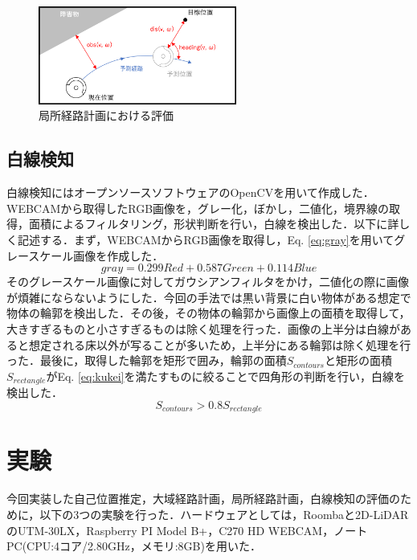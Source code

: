 \documentclass{jarticle}
\renewcommand{\%}{\textsf{\char`\%}}
\begin{document}
\begin{figure}
\begin{center}
	\includegraphics[width=6.5cm]{./picture/DWA.png}
\end{center}
\vspace{-3mm}
	\caption{局所経路計画における評価}
	\label{fig:DWA}
\end{figure}
\subsection{白線検知}
白線検知にはオープンソースソフトウェアのOpenCV\cite{opencv}を用いて作成した．WEBCAMから取得したRGB画像を，グレー化，ぼかし，二値化，境界線の取得，面積によるフィルタリング，形状判断を行い，白線を検出した．以下に詳しく記述する．まず，WEBCAMからRGB画像を取得し，Eq. \ref{eq:gray}を用いてグレースケール画像を作成した．
\vspace{-3mm}
\begin{equation}
	gray = 0.299Red + 0.587Green + 0.114Blue
	\label{eq:gray}
\end{equation}
そのグレースケール画像に対してガウシアンフィルタをかけ，二値化の際に画像が煩雑にならないようにした．今回の手法では黒い背景に白い物体がある想定で物体の輪郭を検出した．その後，その物体の輪郭から画像上の面積を取得して，大きすぎるものと小さすぎるものは除く処理を行った．画像の上半分は白線があると想定される床以外が写ることが多いため，上半分にある輪郭は除く処理を行った．最後に，取得した輪郭を矩形で囲み，輪郭の面積$S_{contours}$と矩形の面積$S_{rectangle}$がEq. \ref{eq:kukei}を満たすものに絞ることで四角形の判断を行い，白線を検出した．
\vspace{-3mm}
\begin{equation}
	S_{contours} > 0.8S_{rectangle}
	\label{eq:kukei}
\end{equation}
\section{実験}
今回実装した自己位置推定，大域経路計画，局所経路計画，白線検知の評価のために，以下の3つの実験を行った．ハードウェアとしては，Roomba\cite{roomba}と2D-LiDARのUTM-30LX\cite{lrf}，Raspberry PI Model B+\cite{raspi}，C270 HD WEBCAM\cite{webcam}，ノートPC(CPU:4コア/2.80GHz，メモリ:8GB)を用いた．
\end{document}
